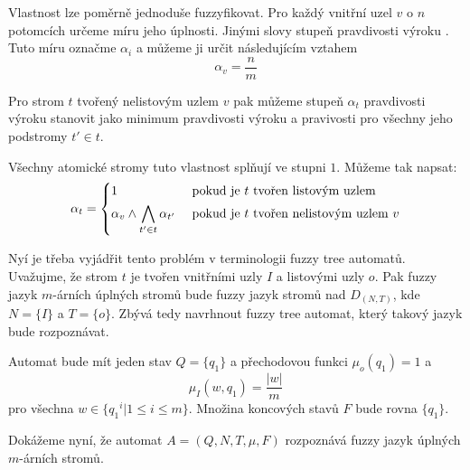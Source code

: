 \documentclass[a4paper,10pt]{article}
\begin{document}
Vlastnost  lze poměrně jednoduše fuzzyfikovat. Pro každý vnitřní uzel $v$ o $n$ potomcích určeme míru jeho úplnosti. Jinými slovy stupeň pravdivosti výroku . Tuto míru označme $\alpha_i$ a můžeme ji určit následujícím vztahem
$$
  \alpha_v = \frac{n}{m}
$$

Pro strom $t$ tvořený nelistovým uzlem $v$ pak můžeme stupeň $\alpha_t$ pravdivosti výroku  stanovit jako minimum pravdivosti výroku  a pravivosti  pro všechny jeho podstromy $t' \in t$.

Všechny atomické stromy tuto vlastnost splňují ve stupni $1$. Můžeme tak napsat:
$$
  \alpha_t = 
    \begin{dcases}
      1 				& \text{ pokud je $t$ tvořen listovým uzlem} \\
      \alpha_v \wedge \bigwedge_{t' \in t} \alpha_{t'} 	& \text{ pokud je $t$ tvořen nelistovým uzlem $v$}
    \end{dcases}
$$

Nyí je třeba vyjádřit tento problém v terminologii fuzzy tree automatů. Uvažujme, že strom $t$ je tvořen vnitřními uzly $I$ a listovými uzly $o$. Pak fuzzy jazyk $m$-árních úplných stromů bude fuzzy jazyk stromů nad $D_{(N,T)}$, kde $N = \{ I \}$ a $T = \{ o \}$. Zbývá tedy navrhnout fuzzy tree automat, který takový jazyk bude rozpoznávat.

Automat bude mít jeden stav $Q = \{ q_1 \}$ a přechodovou funkci $\mu_o(q_1) = 1$ a 
$$
  \mu_I(w, q_1) = \frac{|w|}{m}
$$
pro všechna $w \in \{ {q_1}^i |  1 \leq i \leq m \}$. Množina koncových stavů $F$ bude rovna $\{ q_1 \}$.

Dokážeme nyní, že automat $A = (Q, N, T, \mu, F)$ rozpoznává fuzzy jazyk úplných $m$-árních stromů. 
\end{document}

